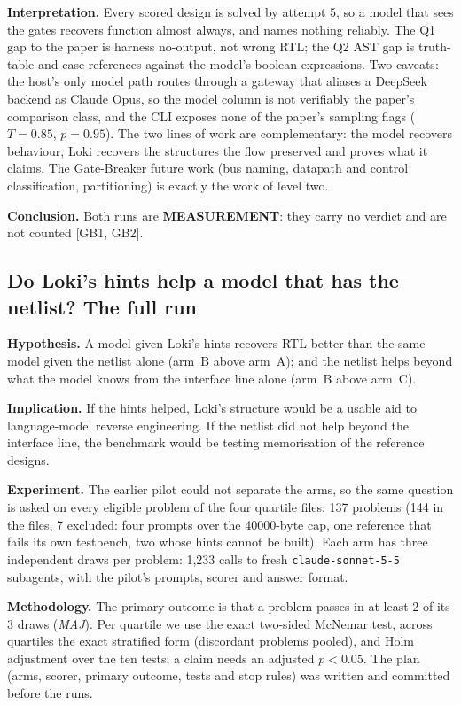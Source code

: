 \documentclass[conference]{IEEEtran}
\newcommand{\verdict}[1]{\textbf{\textsc{#1}}}
\newcommand{\hev}[1]{\par\smallskip\noindent\textbf{#1}}
\newcommand{\code}[1]{\texttt{#1}}
\begin{document}
\hev{Interpretation.} Every scored design is solved by attempt 5, so a model that sees the gates recovers function almost always, and names nothing reliably. The Q1 gap to the paper is harness no-output, not wrong RTL; the Q2 AST gap is truth-table and case references against the model's boolean expressions. Two caveats: the host's only model path routes through a gateway that aliases a DeepSeek backend as Claude Opus, so the model column is not verifiably the paper's comparison class, and the CLI exposes none of the paper's sampling flags ($T{=}0.85$, $p{=}0.95$). The two lines of work are complementary: the model recovers behaviour, Loki recovers the structures the flow preserved and proves what it claims. The Gate-Breaker future work (bus naming, datapath and control classification, partitioning) is exactly the work of level two.

\hev{Conclusion.} Both runs are \verdict{MEASUREMENT}: they carry no verdict and are not counted [GB1, GB2].

\subsection{Do Loki's hints help a model that has the netlist? The full run}
\label{arg:la2}
\label{sec:llm-full}

\hev{Hypothesis.} A model given Loki's hints recovers RTL better than the same model given the netlist alone (arm~B above arm~A); and the netlist helps beyond what the model knows from the interface line alone (arm~B above arm~C).

\hev{Implication.} If the hints helped, Loki's structure would be a usable aid to language-model reverse engineering. If the netlist did not help beyond the interface line, the benchmark would be testing memorisation of the reference designs.

\hev{Experiment.} The earlier pilot could not separate the arms, so the same question is asked on every eligible problem of the four quartile files: 137 problems (144 in the files, 7 excluded: four prompts over the 40000-byte cap, one reference that fails its own testbench, two whose hints cannot be built). Each arm has three independent draws per problem: 1,233 calls to fresh \code{claude-sonnet-5-5} subagents, with the pilot's prompts, scorer and answer format.

\hev{Methodology.} The primary outcome is that a problem passes in at least 2 of its 3 draws (\emph{MAJ}). Per quartile we use the exact two-sided McNemar test, across quartiles the exact stratified form (discordant problems pooled), and Holm adjustment over the ten tests; a claim needs an adjusted $p<0.05$. The plan (arms, scorer, primary outcome, tests and stop rules) was written and committed before the runs.
\end{document}
